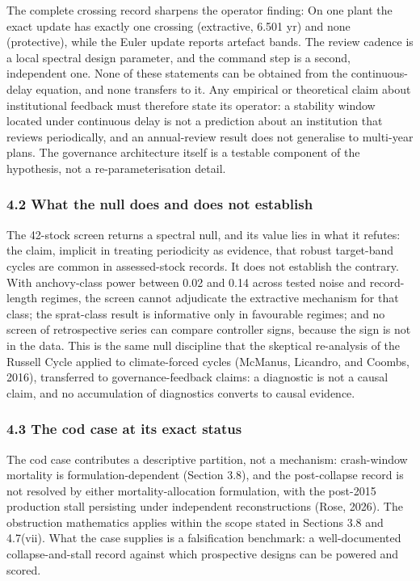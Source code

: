 \documentclass[11pt]{article}
\begin{document}
The complete crossing record sharpens the operator finding:
On one plant the exact update has exactly one crossing (extractive, 6.501
yr) and none (protective), while the Euler update reports artefact
bands. The review cadence is a local spectral design parameter, and the
command step is a second, independent one. None of these statements can
be obtained from the continuous-delay equation, and none transfers to
it. Any empirical or theoretical claim about institutional feedback must
therefore state its operator: a stability window located under
continuous delay is not a prediction about an institution that reviews
periodically, and an annual-review result does not generalise to
multi-year plans. The governance architecture itself is a testable
component of the hypothesis, not a re-parameterisation detail.

\subsubsection{4.2 What the null does and does not
establish}\label{what-the-null-does-and-does-not-establish}

The 42-stock screen returns a spectral null, and its value lies in what
it refutes: the claim, implicit in treating periodicity as evidence,
that robust target-band cycles are common in assessed-stock records. It
does not establish the contrary. With anchovy-class power between 0.02
and 0.14 across tested noise and record-length regimes, the screen
cannot adjudicate the extractive mechanism for that class; the
sprat-class result is informative only in favourable regimes; and no
screen of retrospective series can compare controller signs, because the
sign is not in the data. This is the same null discipline that the
skeptical re-analysis of the Russell Cycle applied to climate-forced
cycles (McManus, Licandro, and Coombs, 2016), transferred to
governance-feedback claims: a diagnostic is not a causal claim, and no
accumulation of diagnostics converts to causal evidence.

\subsubsection{4.3 The cod case at its exact
status}\label{the-cod-case-at-its-exact-status}

The cod case contributes a descriptive partition, not a mechanism:
crash-window mortality is formulation-dependent (Section 3.8), and the
post-collapse record is not resolved by either mortality-allocation
formulation, with the post-2015 production stall persisting under
independent reconstructions (Rose, 2026). The obstruction mathematics
applies within the scope stated in Sections 3.8 and 4.7(vii). What the
case supplies is a falsification benchmark: a well-documented
collapse-and-stall record against which prospective designs can be
powered and scored.
\end{document}
